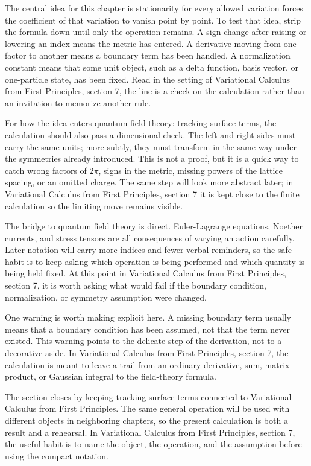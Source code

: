 The central idea for this chapter is stationarity for every allowed variation forces the coefficient of that variation to vanish point by point.  To test that idea, strip the formula down until only the operation remains.  A sign change after raising or lowering an index means the metric has entered.  A derivative moving from one factor to another means a boundary term has been handled.  A normalization constant means that some unit object, such as a delta function, basis vector, or one-particle state, has been fixed.  Read in the setting of Variational Calculus from First Principles, section 7, the line is a check on the calculation rather than an invitation to memorize another rule.

For how the idea enters quantum field theory: tracking surface terms, the calculation should also pass a dimensional check.  The left and right sides must carry the same units; more subtly, they must transform in the same way under the symmetries already introduced.  This is not a proof, but it is a quick way to catch wrong factors of \(2\pi\), signs in the metric, missing powers of the lattice spacing, or an omitted charge.  The same step will look more abstract later; in Variational Calculus from First Principles, section 7 it is kept close to the finite calculation so the limiting move remains visible.

The bridge to quantum field theory is direct.  Euler-Lagrange equations, Noether currents, and stress tensors are all consequences of varying an action carefully.  Later notation will carry more indices and fewer verbal reminders, so the safe habit is to keep asking which operation is being performed and which quantity is being held fixed.  At this point in Variational Calculus from First Principles, section 7, it is worth asking what would fail if the boundary condition, normalization, or symmetry assumption were changed.

One warning is worth making explicit here.  A missing boundary term usually means that a boundary condition has been assumed, not that the term never existed.  This warning points to the delicate step of the derivation, not to a decorative aside.  In Variational Calculus from First Principles, section 7, the calculation is meant to leave a trail from an ordinary derivative, sum, matrix product, or Gaussian integral to the field-theory formula.

The section closes by keeping tracking surface terms connected to Variational Calculus from First Principles.  The same general operation will be used with different objects in neighboring chapters, so the present calculation is both a result and a rehearsal.  In Variational Calculus from First Principles, section 7, the useful habit is to name the object, the operation, and the assumption before using the compact notation.



